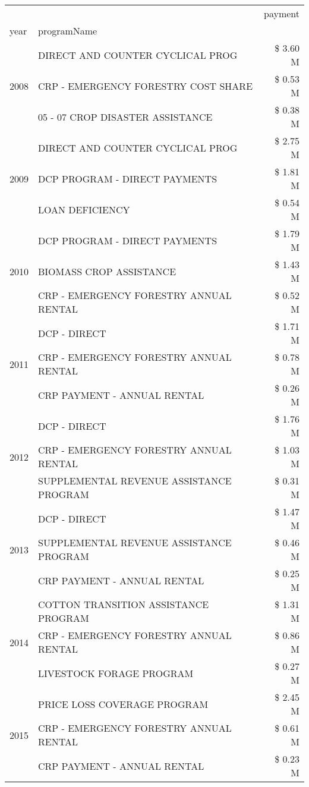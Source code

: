 \begin{tabular}{llr}
\toprule
 &  & payment \\
year & programName &  \\
\midrule
\multirow[t]{3}{*}{2008} & DIRECT AND COUNTER CYCLICAL PROG & \$ 3.60 M \\
 & CRP - EMERGENCY FORESTRY COST SHARE & \$ 0.53 M \\
 & 05 - 07 CROP DISASTER ASSISTANCE & \$ 0.38 M \\
\cline{1-3}
\multirow[t]{3}{*}{2009} & DIRECT AND COUNTER CYCLICAL PROG & \$ 2.75 M \\
 & DCP PROGRAM - DIRECT PAYMENTS & \$ 1.81 M \\
 & LOAN DEFICIENCY & \$ 0.54 M \\
\cline{1-3}
\multirow[t]{3}{*}{2010} & DCP PROGRAM - DIRECT PAYMENTS & \$ 1.79 M \\
 & BIOMASS CROP ASSISTANCE & \$ 1.43 M \\
 & CRP - EMERGENCY FORESTRY ANNUAL RENTAL & \$ 0.52 M \\
\cline{1-3}
\multirow[t]{3}{*}{2011} & DCP - DIRECT & \$ 1.71 M \\
 & CRP - EMERGENCY FORESTRY ANNUAL RENTAL & \$ 0.78 M \\
 & CRP PAYMENT - ANNUAL RENTAL & \$ 0.26 M \\
\cline{1-3}
\multirow[t]{3}{*}{2012} & DCP - DIRECT & \$ 1.76 M \\
 & CRP - EMERGENCY FORESTRY ANNUAL RENTAL & \$ 1.03 M \\
 & SUPPLEMENTAL REVENUE ASSISTANCE PROGRAM & \$ 0.31 M \\
\cline{1-3}
\multirow[t]{3}{*}{2013} & DCP - DIRECT & \$ 1.47 M \\
 & SUPPLEMENTAL REVENUE ASSISTANCE PROGRAM & \$ 0.46 M \\
 & CRP PAYMENT - ANNUAL RENTAL & \$ 0.25 M \\
\cline{1-3}
\multirow[t]{3}{*}{2014} & COTTON TRANSITION ASSISTANCE PROGRAM & \$ 1.31 M \\
 & CRP - EMERGENCY FORESTRY ANNUAL RENTAL & \$ 0.86 M \\
 & LIVESTOCK FORAGE PROGRAM & \$ 0.27 M \\
\cline{1-3}
\multirow[t]{3}{*}{2015} & PRICE LOSS COVERAGE PROGRAM & \$ 2.45 M \\
 & CRP - EMERGENCY FORESTRY ANNUAL RENTAL & \$ 0.61 M \\
 & CRP PAYMENT - ANNUAL RENTAL & \$ 0.23 M \\
\cline{1-3}

\end{tabular}
